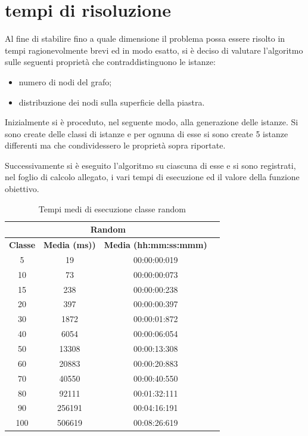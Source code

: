 %
%
\section[Tempi di risoluzione]{tempi di risoluzione}
\label{pt1:time}
Al fine di stabilire fino a quale dimensione il problema possa essere risolto in tempi ragionevolmente brevi ed in modo esatto, si è deciso di valutare l'algoritmo sulle seguenti proprietà che contraddistinguono le istanze:

\begin{itemize}
\item numero di nodi del grafo;
\item distribuzione dei nodi sulla superficie della piastra.
\end{itemize}

Inizialmente si è proceduto, nel seguente modo, alla generazione delle istanze. Si sono create delle classi di istanze e per ognuna di esse si sono create 5 istanze differenti ma che condividessero le proprietà sopra riportate.

Successivamente si è eseguito l'algoritmo su ciascuna di esse e si sono registrati, nel foglio di calcolo allegato, i vari tempi di esecuzione ed il valore della funzione obiettivo.

\begin{table}[htbp]
\centering
\label{pt1:time:tabular_random}
\begin{tabular}{|c|c|c|c|}
\hline
\multicolumn{3}{|c|}{Random}\\
\hline
\textbf{Classe} & \textbf{Media (ms))} & \textbf{Media (hh:mm:ss:mmm)}\\
\hline
5   &     19 & 00:00:00:019\\
\hline
10  &     73 & 00:00:00:073\\
\hline
15  &    238 & 00:00:00:238\\
\hline
20  &    397 & 00:00:00:397\\
\hline
30  &   1872 & 00:00:01:872\\
\hline
40  &   6054 & 00:00:06:054\\
\hline
50  &  13308 & 00:00:13:308\\
\hline
60  &  20883 & 00:00:20:883\\
\hline
70  &  40550 & 00:00:40:550\\
\hline
80  &  92111 & 00:01:32:111\\
\hline
90  & 256191 & 00:04:16:191\\
\hline
100 & 506619 & 00:08:26:619\\
\hline
\end{tabular}
\caption{Tempi medi di esecuzione classe random}
\end{table}

